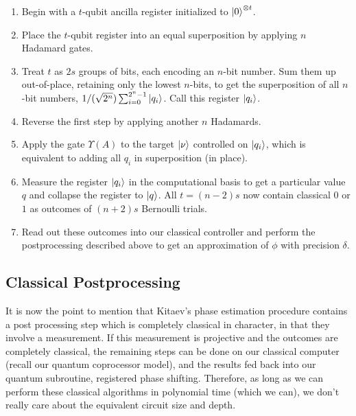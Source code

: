 \begin{enumerate}

\item Begin with a $t$-qubit ancilla register initialized to $\left\vert{0}\right\rangle^{\otimes t}$.

\item Place the $t$-qubit register into an equal superposition by
applying $n$ Hadamard gates.

\item Treat $t$ as $2s$ groups of bits, each encoding an $n$-bit number.
Sum them up out-of-place, retaining only the lowest $n$-bits,
to get the superposition
of all $n$-bit numbers, $1/(\sqrt{2^{n}}) \sum_{i=0}^{2^n-1} \left\vert{q_i}\right\rangle$.
Call this register $\left\vert{q_i}\right\rangle$.

\item Reverse the first step by applying another $n$ Hadamards.

\item Apply the gate $\Upsilon(A)$ to the target $\left\vert{\nu}\right\rangle$ controlled
on $\left\vert{q_i}\right\rangle$, which is equivalent to adding all $q_i$ in superposition
(in place).

\item Measure the register $\left\vert{q_i}\right\rangle$ in the computational basis to get 
a particular value $q$ and collapse the register to $\left\vert{q}\right\rangle$. All $t=(n-2)s$
now contain classical $0$ or $1$ as outcomes of $(n+2)s$ Bernoulli trials.

\item Read out these outcomes into our classical controller
and perform the postprocessing
described above to get an approximation of $\phi$ with precision $\delta$.

\end{enumerate}

\subsection{Classical Postprocessing}

It is now the point to mention that Kitaev's phase estimation procedure
contains a post processing step which is completely classical in
character, in that they involve a measurement. If this measurement is
projective and the outcomes are completely classical, the remaining steps
can be done on our classical computer (recall our quantum coprocessor model),
and the results fed back into our quantum subroutine, registered
phase shifting. Therefore, as long as we can perform these classical
algorithms in polynomial time (which we can), we don't really care
about the equivalent circuit size and depth.

